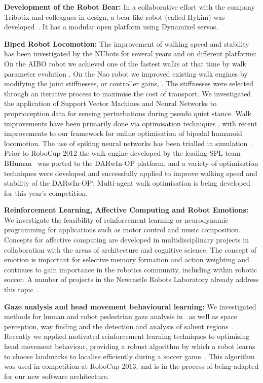 \documentclass{llncs}
\begin{document}
\noindent\textbf{Development of the Robot Bear:} In a collaborative effort with the company Tribotix and colleagues in design, a bear-like robot (called Hykim) was developed~\cite{ChalupEtAl2006}. It has a modular open platform using Dynamixel servos.


\noindent\textbf{Biped Robot Locomotion:} The improvement of walking speed and stability has been investigated by the NUbots for several years and on different platforms: On the AIBO robot we achieved one of the fastest walks at that time by walk parameter evolution \cite{QuinlanEtAlACRA2003,ChalupEtAlSMC2007}. On the Nao robot we improved existing walk engines by modifying the joint stiffnesses, or controller gains, \cite{Kulk2008,Kulk2010,Kulk2010a}. The stiffnesses were selected through an iterative process to maximise the cost of transport. We investigated the application of Support Vector Machines and Neural Networks to proprioception data for sensing perturbations during pseudo quiet stance. Walk improvements have been primarily done via optimisation techniques \cite{Kulk2011a},  %
with recent improvements to our framework for online optimisation of bipedal humanoid locomotion.
The use of spiking neural networks has been trialled in simulation~\cite{WiklendtChalup2008}. Prior to RoboCup 2012 the walk engine developed by the leading SPL team BHuman~\cite{BHumanWalk2010} was ported to the DARwIn-OP platform, and a variety of optimisation techniques were developed and successfully applied to improve walking speed and stability of the DARwIn-OP`\cite{budden2013probabilistic}. Multi-agent walk optimisation is being developed for this year's competition.

\noindent\textbf{Reinforcement Learning, Affective Computing and Robot Emotions:} We investigate the feasibility of reinforcement learning or neurodynamic programming for applications such as motor control and music composition. Concepts for affective computing are developed in multidisciplinary projects in collaboration with the areas of architecture and cognitive science. The concept of emotion is important for selective memory formation and action weighting and continues to gain importance in the robotics community, including within robotic soccer. A number of projects in the Newcastle Robots Laboratory already address this topic~\cite{Pareidolia2010,HongEtAl2013a,HongEtAl2013b,WongEtAl2013,hong2014affective}.


\noindent\textbf{Gaze analysis and head movement behavioural learning:} We investigated methods for human and robot pedestrian gaze analysis in~\cite{JalalianEtAl_CAADRIA2011,WongEtAl2012} as well as space perception, way finding and the detection and analysis of salient regions~\cite{BhatiaChalup2013,BhatiaEtAl2013,BhatiaChalupOstwald2013}. Recently we  applied motivated reinforcement learning techniques to optimising head movement behaviour, providing a robust algorithm by which a robot learns to choose landmarks to localise efficiently during a soccer game~\cite{FountainEtAl2014}. This algorithm was used in competition at RoboCup 2013, and is in the process of being adapted for our new software architecture.
\end{document}

